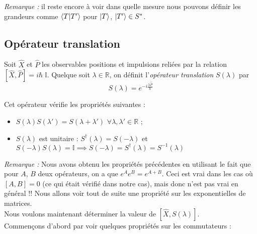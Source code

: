 \documentclass{article}
\begin{document}
\textit{Remarque :} il reste encore à voir dans quelle mesure nous pouvons définir les grandeurs comme $\braket{T|T'}$ pour $\ket{T}$, $\ket{T'} \in S^*$. 


\subsection*{Opérateur translation}

Soit $\hat{X}$ et $\hat{P}$ les observables positions et impulsions reliées par la relation $[\hat{X}, \hat{P}] = i\hbar \; \mathbb{I}$. Quelque soit $\lambda \in \mathbb{R}$, on définit l'\emph{opérateur translation} $S(\lambda)$ par
$$ S(\lambda) = e^{-i\frac{\lambda \hat{P}}{\hbar}} $$

Cet opérateur vérifie les propriétés suivantes : 
\begin{itemize}[label = \textbullet]
    \item $S(\lambda) S(\lambda') = S(\lambda + \lambda')$  \; $\forall \lambda, \lambda' \in \mathbb{R}$ ; 
    \item $S(\lambda)$ est unitaire : $S^\dagger (\lambda) = S(-\lambda)$ et $S(-\lambda)S(\lambda) = \mathbb{I} \implies S(-\lambda) = S^\dagger(\lambda) = S^{-1}(\lambda)$
\end{itemize}

\textit{Remarque :} Nous avons obtenu les propriétés précédentes en utilisant le fait que pour $A$, $B$ deux opérateurs, on a que $e^A e^B = e^{A+B}$. Ceci est vrai dans les cas où $[A, B] = 0$ (ce qui était vérifié dans notre cas), mais donc n'est pas vrai en général !! Nous allons voir tout de suite une propriété sur les exponentielles de matrices. \\

Nous voulons maintenant déterminer la valeur de $[\hat{X},S(\lambda)]$. \\

Commençons d'abord par voir quelques propriétés sur les commutateurs : 
\end{document}
